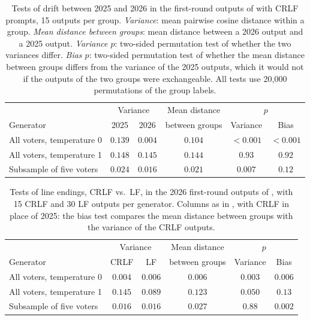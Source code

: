 \documentclass[letterpaper]{article} %
\begin{document}
\begin{table}[t]
\centering
\begin{tabular}{lccccc}
\hline
& \multicolumn{2}{c}{Variance} & Mean distance & \multicolumn{2}{c}{\(p\)} \\
Generator & 2025 & 2026 & between groups & Variance & Bias \\
\hline
All voters, temperature 0 & \(0.139\) & \(0.004\) & \(0.104\) & \(<0.001\) & \(<0.001\) \\
All voters, temperature 1 & \(0.148\) & \(0.145\) & \(0.144\) & \(0.93\) & \(0.92\) \\
Subsample of five voters & \(0.024\) & \(0.016\) & \(0.021\) & \(0.007\) & \(0.12\) \\
\hline
\end{tabular}
\caption{Tests of drift between 2025 and 2026 in the first-round outputs of  with CRLF prompts, 15 outputs per group. \emph{Variance}: mean pairwise cosine distance within a group. \emph{Mean distance between groups}: mean distance between a 2026 output and a 2025 output. \emph{Variance \(p\)}: two-sided permutation test of whether the two variances differ. \emph{Bias \(p\)}: two-sided permutation test of whether the mean distance between groups differs from the variance of the 2025 outputs, which it would not if the outputs of the two groups were exchangeable. All tests use 20{,}000 permutations of the group labels.}
\label{tab:model-drift-generation-tests}
\end{table}

\begin{table}[t]
\centering
\begin{tabular}{lccccc}
\hline
& \multicolumn{2}{c}{Variance} & Mean distance & \multicolumn{2}{c}{\(p\)} \\
Generator & CRLF & LF & between groups & Variance & Bias \\
\hline
All voters, temperature 0 & \(0.004\) & \(0.006\) & \(0.006\) & \(0.003\) & \(0.006\) \\
All voters, temperature 1 & \(0.145\) & \(0.089\) & \(0.123\) & \(0.050\) & \(0.13\) \\
Subsample of five voters & \(0.016\) & \(0.016\) & \(0.027\) & \(0.88\) & \(0.002\) \\
\hline
\end{tabular}
\caption{Tests of line endings, CRLF vs.\ LF, in the 2026 first-round outputs of , with 15 CRLF and 30 LF outputs per generator. Columns as in , with CRLF in place of 2025: the bias test compares the mean distance between groups with the variance of the CRLF outputs.}
\label{tab:line-endings-generation-tests}
\end{table}
\end{document}
